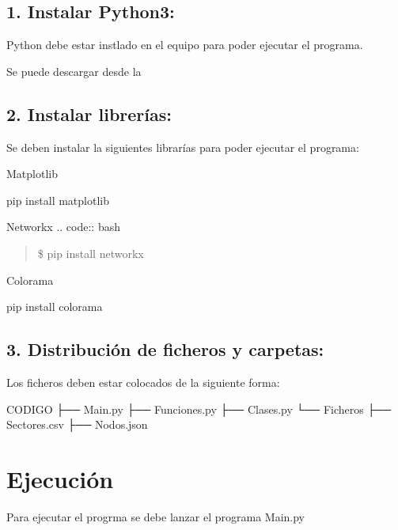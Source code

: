 \documentclass[letterpaper,10pt,spanish]{sphinxmanual}
\begin{document}
\subsection{1. Instalar Python3:}
\label{\detokenize{Introduccion:instalar-python3}}
\sphinxAtStartPar
Python debe estar instlado en el equipo para poder ejecutar el programa.

\sphinxAtStartPar
Se puede descargar desde la 


\subsection{2. Instalar librerías:}
\label{\detokenize{Introduccion:instalar-librerias}}
\sphinxAtStartPar
Se deben instalar la siguientes librarías para poder ejecutar el programa:

\sphinxAtStartPar
Matplotlib

\begin{sphinxVerbatim}[commandchars=\\\{\}]
\PYGZdl{} pip install matplotlib
\end{sphinxVerbatim}

\sphinxAtStartPar
Networkx
.. code:: bash
\begin{quote}

\sphinxAtStartPar
\$ pip install networkx
\end{quote}

\sphinxAtStartPar
Colorama

\begin{sphinxVerbatim}[commandchars=\\\{\}]
\PYGZdl{} pip install colorama
\end{sphinxVerbatim}


\subsection{3. Distribución de ficheros y carpetas:}
\label{\detokenize{Introduccion:distribucion-de-ficheros-y-carpetas}}
\sphinxAtStartPar
Los ficheros deben estar colocados de la siguiente forma:

\begin{sphinxVerbatim}[commandchars=\\\{\}]
CODIGO
├── Main.py
├── Funciones.py
├── Clases.py
└── Ficheros
        ├── Sectores.csv
        ├── Nodos.json
\end{sphinxVerbatim}


\section{Ejecución}
\label{\detokenize{Introduccion:ejecucion}}
\sphinxAtStartPar
Para ejecutar el progrma se debe lanzar el programa Main.py
\end{document}
